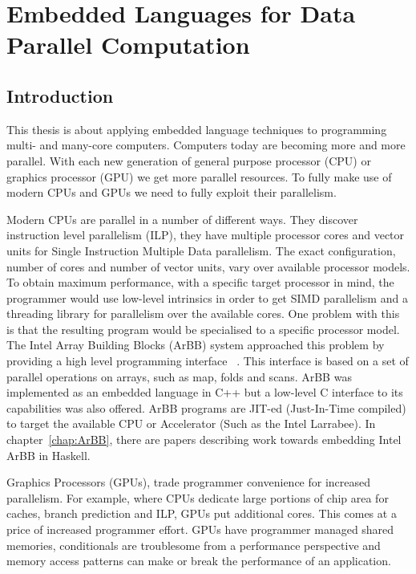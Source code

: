 \documentclass[a4paper]{book}
\newcommand{\thesistitle}{Embedded Languages for Data Parallel Computation}
\begin{document}
\chapter{\thesistitle}

\section{Introduction} 

This thesis is about applying embedded language techniques to programming 
multi- and many-core computers. Computers today are becoming more and more  
parallel. With each new generation of 
general purpose processor (CPU) or graphics processor (GPU) we get more 
parallel resources. To fully make use of modern CPUs and GPUs we need to fully 
exploit their parallelism. 

Modern CPUs are parallel in a number of different ways. They discover instruction
level parallelism (ILP), they have multiple processor cores and vector units for 
Single Instruction Multiple Data parallelism. The exact configuration, number
of cores and number of vector units, vary over available processor models. 
To obtain maximum performance, with a specific target processor in mind, the programmer
would use low-level intrinsics in order to get SIMD parallelism and a threading library
for parallelism over the available cores. One problem with this is that the resulting program 
would be specialised to a specific processor model. The Intel Array Building Blocks (ArBB) 
system approached this problem by providing a high level programming interface~\citet{ARBB2011}
. This interface is based on a set of parallel operations on arrays, such as map, folds 
and scans. ArBB was implemented as an embedded language in C++ but a low-level C interface to 
its capabilities was also offered. ArBB programs are JIT-ed (Just-In-Time compiled) to 
target the available CPU or Accelerator (Such as the Intel Larrabee). In 
chapter~\ref{chap:ArBB}, there are papers describing work towards embedding Intel 
ArBB in Haskell. 

Graphics Processors (GPUs), trade programmer convenience for increased parallelism. 
For example, where CPUs dedicate large portions of chip area for caches, branch prediction and 
ILP, GPUs put additional cores. This comes at a price of increased programmer effort.
GPUs have programmer managed shared memories, conditionals are troublesome from a performance 
perspective and memory access patterns can make or break the performance of an 
application.  
\end{document}
